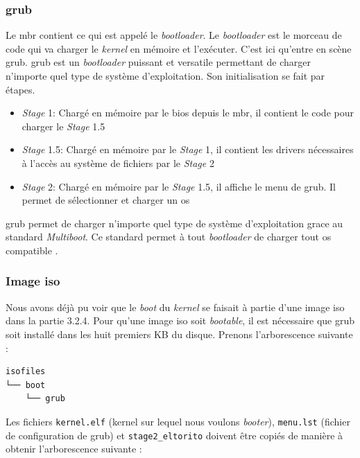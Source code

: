 \documentclass[a4paper]{article}
\begin{document}
\subsubsection{\acrshort{grub}}
Le \acrshort{mbr} contient ce qui est appelé le \textit{bootloader}. Le \textit{bootloader}
est le morceau de code qui va charger le \textit{kernel} en mémoire et l'exécuter.
C'est ici qu'entre en scène \acrshort{grub}. \acrshort{grub} est un \textit{bootloader}
puissant et versatile permettant de charger n’importe quel type de système d’exploitation.
Son initialisation se fait par étapes.
\begin{itemize}[label=\textbullet]
	\item \textit{Stage} 1: Chargé en mémoire par le \acrshort{bios} depuis le
    \acrshort{mbr}, il contient le code pour charger le \textit{Stage} 1.5
	\item \textit{Stage} 1.5: Chargé en mémoire par le \textit{Stage} 1, il contient
    les drivers nécessaires à l'accès au système de fichiers par le \textit{Stage} 2
	\item \textit{Stage} 2: Chargé en mémoire par le \textit{Stage} 1.5, il affiche
    le menu de \acrshort{grub}. Il permet de sélectionner et charger un \acrshort{os}
\end{itemize}

\acrshort{grub} permet de charger n'importe quel type de système d'exploitation
grace au standard \textit{Multiboot}. Ce standard permet à tout \textit{bootloader}
de charger tout \acrshort{os} compatible \cite{ref12}.

\subsubsection{Image \acrshort{iso}}
Nous avons déjà pu voir que le \textit{boot} du \textit{kernel} se faisait à partie
d'une image \acrshort{iso} dans la partie 3.2.4. Pour qu'une image \acrshort{iso}
soit \textit{bootable}, il est nécessaire que \acrshort{grub} soit installé dans
les huit premiers KB du disque. Prenons l'arborescence suivante :

\begin{verbatim}
isofiles
└── boot
    └── grub
\end{verbatim}

Les fichiers \texttt{kernel.elf} (kernel sur lequel nous voulons
\textit{booter}), \texttt{menu.lst} (fichier de configuration de \acrshort{grub})
et \texttt{stage2_eltorito} doivent être copiés de manière à obtenir
l'arborescence suivante :
\end{document}
